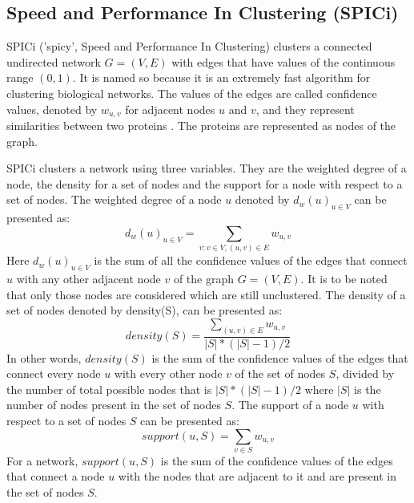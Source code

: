 \documentclass[times]{dacauth}
\begin{document}
\subsection{Speed and Performance In Clustering (SPICi)\cite{spici2010}}
SPICi ('spicy', Speed and Performance In Clustering) clusters a connected undirected network $G=(V,E)$ with edges that have values of the continuous range $(0,1)$. It is named so because it is an extremely fast algorithm for clustering biological networks. The values of the edges are called confidence values, denoted by $w_{u,v}$ for adjacent nodes $u$ and $v$, and they represent similarities between two proteins \cite{protein2005palla}. The proteins are represented as nodes of the graph.

\smallskip
SPICi clusters a network using three variables. They are the weighted degree of a node, the density for a set of nodes and the support for a node with respect to a set of nodes. The weighted degree of a node $u$ denoted by $d_w(u)_{u\in V}$ can be presented as:
\begin{equation} \label{eqn:spicidegree}
d_w(u)_{u\in V} = \sum_{v:v\in V,(u,v) \in E}w_{u,v}
\end{equation}
Here $d_w(u)_{u\in V}$ is the sum of all the confidence values of the edges that connect $u$ with any other adjacent node $v$ of the graph $G=(V,E)$. It is to be noted that only those nodes are considered which are still unclustered. The density of a set of nodes denoted by density(S), can be presented as:
\begin{equation} \label{eqn:spicidensity}
density(S) = \frac{\sum_{(u,v)\in E}w_{u,v}}{|S|*(|S|-1)/2} 
\end{equation}
In other words, $density(S)$ is the sum of the confidence values of the edges that connect every node $u$ with every other node $v$ of the set of nodes $S$, divided by the number of total possible nodes that is $|S|*(|S|-1)/2$ where $|S|$ is the number of nodes present in the set of nodes $S$. The support of a node $u$ with respect to a set of nodes $S$ can be presented as:
\begin{equation} \label{support}
support(u,S) = \sum_{v\in S} w_{u,v}
\end{equation}
For a network, $support(u,S)$ is the sum of the confidence values of the edges that connect a node $u$ with the nodes that are adjacent to it and are present in the set of nodes $S$.
\end{document}
